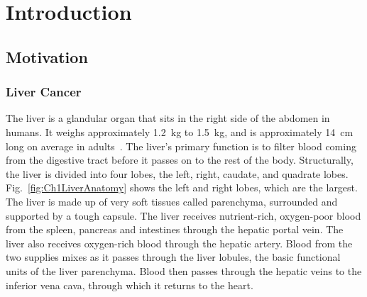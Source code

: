 \chapter{Introduction}

\section{Motivation}

\subsection{Liver Cancer}
The liver is a glandular organ that sits in the right side of the abdomen in humans. It weighs approximately 1.2~kg to 1.5~kg, and is approximately 14~cm long on average in adults~\cite{Wolf1990,Kratzer2003}. The liver's primary function is to filter blood coming from the digestive tract before it passes on to the rest of the body. Structurally, the liver is divided into four lobes, the left, right, caudate, and quadrate lobes. Fig.~\ref{fig:Ch1LiverAnatomy} shows the left and right lobes, which are the largest. The liver is made up of very soft tissues called parenchyma, surrounded and supported by a tough capsule. The liver receives nutrient-rich, oxygen-poor blood from the spleen, pancreas and intestines through the hepatic portal vein. The liver also receives oxygen-rich blood through the hepatic artery. Blood from the two supplies mixes as it passes through the liver lobules, the basic functional units of the liver parenchyma. Blood then passes through the hepatic veins to the inferior vena cava, through which it returns to the heart.

